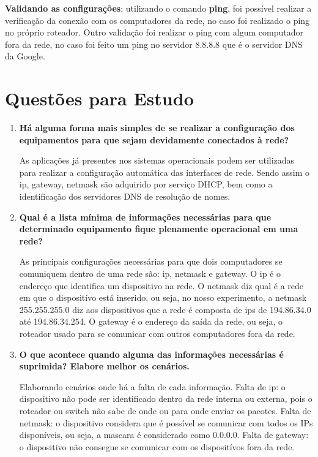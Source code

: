 \textbf{Validando as configurações}: utilizando o comando \textbf{ping}, foi possível realizar
a verificação da conexão com os computadores da rede, no caso foi realizado
o ping no próprio roteador. Outro validação foi realizar o ping com algum
computador fora da rede, no caso foi feito um ping no servidor 8.8.8.8 que é
o servidor DNS da Google.

\section{Questões para Estudo}

\begin{enumerate}
  \item \textbf{Há alguma forma mais simples de se realizar a configuração dos
  equipamentos para que sejam devidamente conectados à rede?}

  As aplicações já presentes nos sistemas operacionais podem ser utilizadas
  para realizar a configuração automática das interfaces de rede. Sendo assim
  o ip, gateway, netmask são adquirido por serviço DHCP, bem como a identificação
  dos servidores DNS de resolução de nomes.

  \item \textbf{Qual é a lista mínima de informações necessárias para que
  determinado equipamento fique plenamente operacional em uma rede?}

  As principais configurações necessárias para que dois computadores se
  comuniquem dentro de uma rede são: ip, netmask e gateway. O ip é o endereço
  que identifica um dispositivo na rede. O netmask diz qual é a rede em que
  o dispositívo está inserido, ou seja, no nosso experimento, a netmask
  255.255.255.0 diz aos dispositivos que a rede é composta de ips de
  194.86.34.0 até 194.86.34.254. O gateway é o endereço da saída da
  rede, ou seja, o roteador usado para se comunicar com outros computadores
  fora da rede.

  \item \textbf{O que acontece quando alguma das informações necessárias é
  suprimida? Elabore melhor os cenários.}

  Elaborando cenários onde há a falta de cada informação.
  Falta de ip: o dispositivo não pode ser identificado dentro
  da rede interna ou externa, pois o roteador ou switch não sabe de onde ou
  para onde enviar os pacotes.
  Falta de netmask: o dispositivo considera que é possível se comunicar com
  todos os IPs disponíveis, ou seja, a mascara é considerado como 0.0.0.0.
  Falta de gateway: o dispositivo não consegue se comunicar com os dispositívos
  fora da rede.

\end{enumerate}



